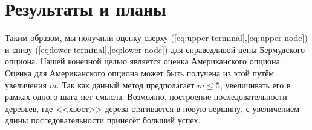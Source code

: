\documentclass[a4paper,10pt]{article}
\begin{document}
\section{Результаты и планы}
\par Таким образом, мы получили оценку сверху (\eqref{eq:upper-terminal},\eqref{eq:upper-node}) и снизу (\eqref{eq:lower-terminal},\eqref{eq:lower-node}) для справедливой цены Бермудского опциона. Нашей конечной целью является оценка Американского опциона. Оценка для Американского опциона может быть получена из этой путём увеличения $m$. Так как данный метод предполагает $m \leqslant 5$, увеличивать его в рамках одного шага нет смысла. Возможно, построение последовательности деревьев, где <<хвост>> дерева стягивается в новую вершину, с увеличением длины последовательности принесёт больший успех.
\nocite{*}

\end{document}
